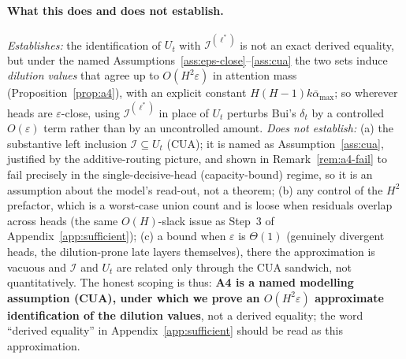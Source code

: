 \paragraph{What this does and does not establish.}
\emph{Establishes:} the identification of $U_t$ with $\mathcal{I}^{(\ell^*)}$ is
not an exact derived equality, but under the named
Assumptions~\ref{ass:eps-close}--\ref{ass:cua} the two sets induce
\emph{dilution values} that agree up to $O(H^2\varepsilon)$ in attention mass
(Proposition~\ref{prop:a4}), with an explicit constant $H(H-1)k\bar\alpha_{\max}$;
so wherever heads are $\varepsilon$-close, using $\mathcal{I}^{(\ell^*)}$ in
place of $U_t$ perturbs Bui's $\delta_t$ by a controlled $O(\varepsilon)$ term
rather than by an uncontrolled amount. \emph{Does not establish:} (a) the
substantive left inclusion $\mathcal{I}\subseteq U_t$ (CUA); it is named as
Assumption~\ref{ass:cua}, justified by the additive-routing picture, and shown
in Remark~\ref{rem:a4-fail} to fail precisely in the single-decisive-head
(capacity-bound) regime, so it is an assumption about the model's read-out, not
a theorem; (b) any control of the $H^2$ prefactor, which is a worst-case union
count and is loose when residuals overlap across heads (the same $O(H)$-slack
issue as Step~3 of Appendix~\ref{app:sufficient}); (c) a bound when
$\varepsilon$ is $\Theta(1)$ (genuinely divergent heads, the dilution-prone late
layers themselves), there the approximation is vacuous and $\mathcal{I}$ and
$U_t$ are related only through the CUA sandwich, not quantitatively. The honest
scoping is thus: \textbf{A4 is a named modelling assumption (CUA), under which
we prove an $O(H^2\varepsilon)$ approximate identification of the dilution
values}, not a derived equality; the word ``derived equality'' in
Appendix~\ref{app:sufficient} should be read as this approximation.
